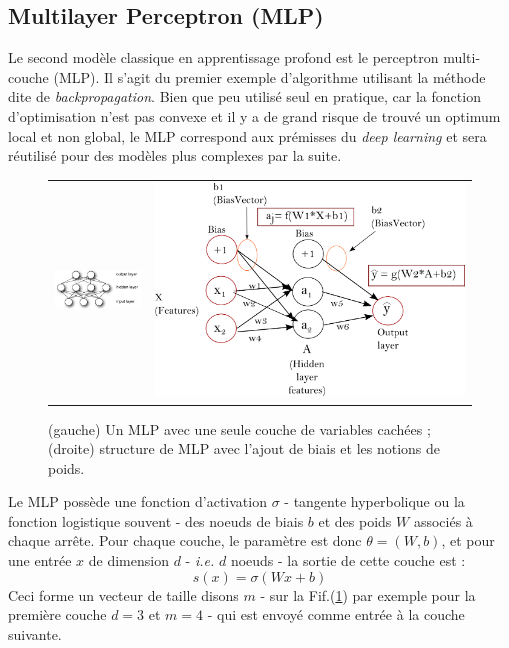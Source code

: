 \documentclass[10pt,a4paper]{article}
\begin{document}
\subsection{Multilayer Perceptron (MLP)}

Le second modèle classique en apprentissage profond est le perceptron multi-couche (MLP). Il s'agit du premier exemple d'algorithme utilisant la méthode dite de \emph{backpropagation}. Bien que peu utilisé seul en pratique, car la fonction d'optimisation n'est pas convexe et il y a de grand risque de trouvé un optimum local et non global, le MLP correspond aux prémisses du \emph{deep learning} et sera réutilisé pour des modèles plus complexes par la suite.

\begin{figure}[ht!]
\centering
\begin{tabular}{cc}
\includegraphics[width = .5\columnwidth]{fig/mlp} &
\includegraphics[width = .5\columnwidth]{fig/backprop_notation.png} 
\end{tabular}
\caption{(gauche) Un MLP avec une seule couche de variables cachées ; (droite) structure de MLP avec l'ajout de biais et les notions de poids.}
\label{fig2}
\end{figure}

Le MLP possède une fonction d'activation $\sigma$ - tangente hyperbolique ou la fonction logistique souvent - des noeuds de biais $b$ et des poids $W$ associés à chaque arrête. Pour chaque couche, le paramètre est donc $\theta = (W,b)$, et pour une entrée $x$ de dimension $d$ - \emph{i.e.} $d$ noeuds - la sortie de cette couche est : 
\begin{equation}
s(x) = \sigma(Wx + b)
\end{equation}
Ceci forme un vecteur de taille disons $m$ - sur la Fif.(\ref{fig2}) par exemple pour la première couche $d=3$ et $m=4$ - qui est envoyé comme entrée à la couche suivante. 
\end{document}
